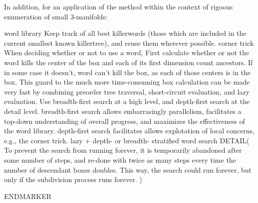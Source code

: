 In addition, for an application of the method within the context of rigoous enumeration
of small $3$-manifolds:
\begin{itemize}
   word library
Keep track of all best killerwords
(those which are included in the current smallest known killertree),
and reuse them wherever possible.
   corner trick
When deciding whether or not to use a word,
First calculate whether or not the word kills the center of the box and each of its first
dimension count ancestors.
If in some case it doesn't, word can't kill the box,
as each of those centers is in the box.
This guard to the much more time-consuming box calculation can be made very fast by 
combining preorder tree traversal, short-circuit evaluation, and lazy evaluation.
   Use breadth-first search at a high level, and depth-first search at the detail level.
breadth-first search allows embarrasingly parallelism,
facilitates a top-down understanding of overall progress,
and maximizes the effectiveness of the word library.
depth-first search facilitates allows explotation of local concerns, e.g., the corner trick.
   lazy + depth- or breadth- stratified word search
DETAIL(
To prevent the search from running forever, it is 
temporarily abandoned after some number of steps, and re-done 
with twice as many steps every time the number of descendant boxes 
doubles.  This way, the search could run forever, but only if
the subdivision process runs forever. 
)
\end{itemize}


ENDMARKER

